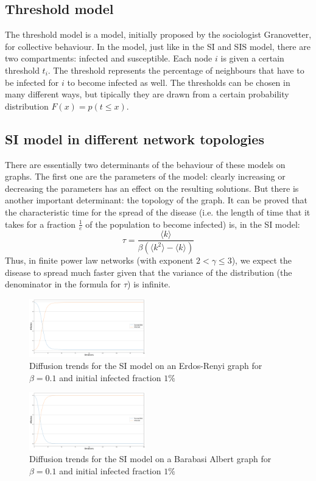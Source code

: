 \documentclass[sigchi]{acmart}
\begin{document}
\subsection{Threshold model}
The threshold model is a model, initially proposed by the sociologist Granovetter\cite{granovetter}, for collective behaviour. In the model, just like in the SI and SIS model, there are two compartments: infected and susceptible. Each node $i$ is given a certain threshold $t_i$. The threshold represents the percentage of neighbours that have to be infected for $i$ to become infected as well. The thresholds can be chosen in many different ways, but tipically they are drawn from a certain probability distribution $F(x) = p(t \leq x)$.

\subsection{SI model in different network topologies}
There are essentially two determinants of the behaviour of these models on graphs. The first one are the parameters of the model: clearly increasing or decreasing the parameters has an effect on the resulting solutions. But there is another important determinant: the topology of the graph. It can be proved that the characteristic time for the spread of the disease (i.e. the length of time that it takes for a fraction $\frac{1}{e}$ of the population to become infected) is, in the SI model:
$$\tau = \frac{\langle k \rangle}{\beta(\langle k^2 \rangle-\langle k \rangle)}$$
Thus, in finite power law networks (with exponent $2 < \gamma \leq 3 $), we expect the disease to spread much faster given that the variance of the distribution (the denominator in the formula for $\tau$) is infinite.

\begin{figure}[!htbp]
    \centering
    \includegraphics[width=0.45\textwidth]{img/SI/diffusionERSI_beta=0.1_frac=0.01.png}
    \caption{Diffusion trends for the SI model on an Erdos-Renyi graph for $\beta = 0.1$ and initial infected fraction $1\%$}
    \label{fig:my_label}
\end{figure}

\begin{figure}[!htbp]
    \centering
    \includegraphics[width=0.45\textwidth]{img/SI/diffusionBASI_beta=0.1_frac=0.01.png}
    \caption{Diffusion trends for the SI model on a Barabasi Albert graph for $\beta = 0.1$ and initial infected fraction $1\%$}
    \label{fig:my_label}
\end{figure}
\end{document}

